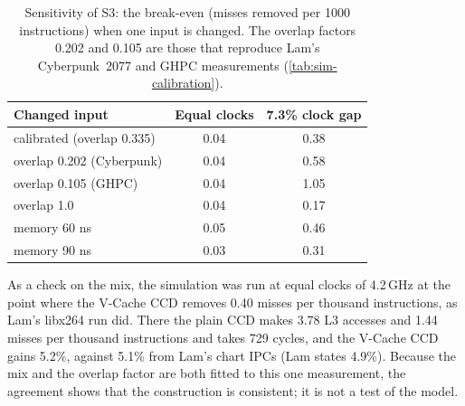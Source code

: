 \begin{table}[htbp]
  \centering
  \caption[Sensitivity of S3: the break-even when one input is changed]{Sensitivity of S3: the break-even (misses removed per 1000 instructions) when one input is changed. The overlap factors 0.202 and 0.105 are those that reproduce Lam's Cyberpunk~2077 and GHPC measurements (\cref{tab:sim-calibration}).}
  \label{tab:sim-s3-sensitivity}
  \small
  \begin{tabular}{@{}lcc@{}}
    \toprule
    \textbf{Changed input} & \textbf{Equal clocks} & \textbf{7.3\% clock gap} \\
    \midrule
    calibrated (overlap 0.335) & 0.04 & 0.38 \\
    overlap 0.202 (Cyberpunk) & 0.04 & 0.58 \\
    overlap 0.105 (GHPC) & 0.04 & 1.05 \\
    overlap 1.0 & 0.04 & 0.17 \\
    memory 60 ns & 0.05 & 0.46 \\
    memory 90 ns & 0.03 & 0.31 \\
    \bottomrule
  \end{tabular}
\end{table}

As a check on the mix, the simulation was run at equal clocks of 4.2\,GHz at the point where the V-Cache CCD removes 0.40 misses per thousand instructions, as Lam's libx264 run did. There the plain CCD makes 3.78 L3 accesses and 1.44 misses per thousand instructions and takes 729 cycles, and the V-Cache CCD gains 5.2\%, against 5.1\% from Lam's chart IPCs (Lam states 4.9\%). Because the mix and the overlap factor are both fitted to this one measurement, the agreement shows that the construction is consistent; it is not a test of the model.

